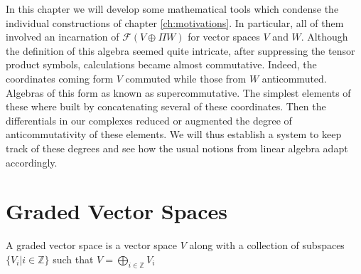 In this chapter we will develop some mathematical tools which condense the individual constructions of chapter \ref{ch:motivations}. In particular, all of them involved an incarnation of $\mathcal{F}(V\oplus\Pi W)$ for vector spaces $V$ and $W$. Although the definition of this algebra seemed quite intricate, after suppressing the tensor product symbols, calculations became almost commutative. Indeed, the coordinates coming form $V$ commuted while those from $W$ anticommuted. Algebras of this form as known as supercommutative. The simplest elements of these where built by concatenating several of these coordinates. Then the differentials in our complexes reduced or augmented the degree of anticommutativity of these elements. We will thus establish a system to keep track of these degrees and see how the usual notions from linear algebra adapt accordingly.

\section{Graded Vector Spaces}

\begin{definition}
A graded vector space is a vector space $V$ along with a collection of subspaces $\{V_i|i\in\mathbb{Z}\}$ such that $V=\bigoplus_{i\in\mathbb{Z}}V_i$
\end{definition}
  